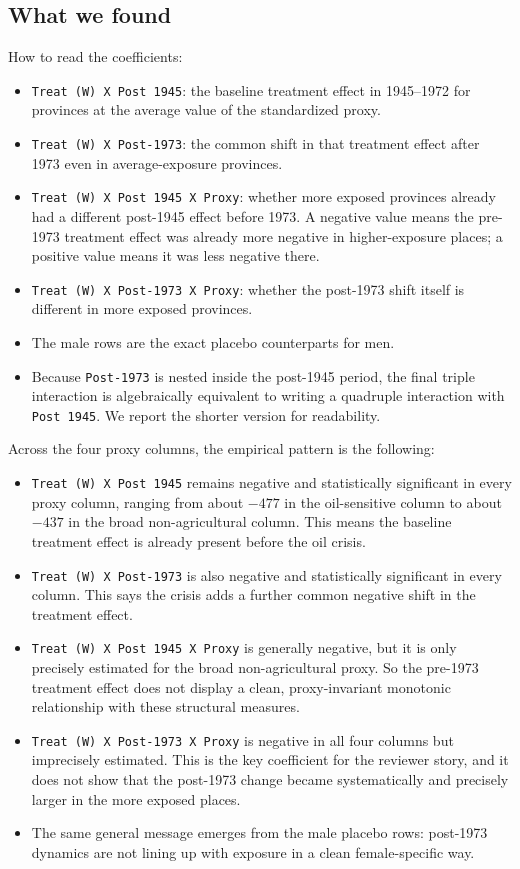\documentclass[11pt]{article}
\begin{document}
\subsection*{What we found}

How to read the coefficients:
\begin{itemize}[leftmargin=*]
\item \texttt{Treat (W) X Post 1945}: the baseline treatment effect in 1945--1972 for provinces at the average value of the standardized proxy.
\item \texttt{Treat (W) X Post-1973}: the common shift in that treatment effect after 1973 even in average-exposure provinces.
\item \texttt{Treat (W) X Post 1945 X Proxy}: whether more exposed provinces already had a different post-1945 effect before 1973. A negative value means the pre-1973 treatment effect was already more negative in higher-exposure places; a positive value means it was less negative there.
\item \texttt{Treat (W) X Post-1973 X Proxy}: whether the post-1973 shift itself is different in more exposed provinces.
\item The male rows are the exact placebo counterparts for men.
\item Because \texttt{Post-1973} is nested inside the post-1945 period, the final triple interaction is algebraically equivalent to writing a quadruple interaction with \texttt{Post 1945}. We report the shorter version for readability.
\end{itemize}

Across the four proxy columns, the empirical pattern is the following:
\begin{itemize}[leftmargin=*]
\item \texttt{Treat (W) X Post 1945} remains negative and statistically significant in every proxy column, ranging from about $-477$ in the oil-sensitive column to about $-437$ in the broad non-agricultural column. This means the baseline treatment effect is already present before the oil crisis.
\item \texttt{Treat (W) X Post-1973} is also negative and statistically significant in every column. This says the crisis adds a further common negative shift in the treatment effect.
\item \texttt{Treat (W) X Post 1945 X Proxy} is generally negative, but it is only precisely estimated for the broad non-agricultural proxy. So the pre-1973 treatment effect does not display a clean, proxy-invariant monotonic relationship with these structural measures.
\item \texttt{Treat (W) X Post-1973 X Proxy} is negative in all four columns but imprecisely estimated. This is the key coefficient for the reviewer story, and it does not show that the post-1973 change became systematically and precisely larger in the more exposed places.
\item The same general message emerges from the male placebo rows: post-1973 dynamics are not lining up with exposure in a clean female-specific way.
\end{itemize}
\end{document}

